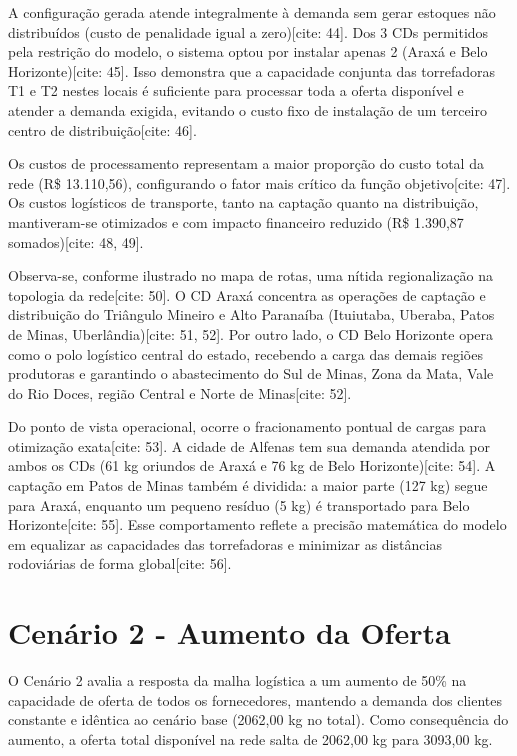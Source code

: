 \documentclass[a4paper,11pt]{article}
\begin{document}
A configuração gerada atende integralmente à demanda sem gerar estoques não distribuídos (custo de penalidade igual a zero)[cite: 44]. Dos 3 CDs permitidos pela restrição do modelo, o sistema optou por instalar apenas 2 (Araxá e Belo Horizonte)[cite: 45]. Isso demonstra que a capacidade conjunta das torrefadoras T1 e T2 nestes locais é suficiente para processar toda a oferta disponível e atender a demanda exigida, evitando o custo fixo de instalação de um terceiro centro de distribuição[cite: 46].

Os custos de processamento representam a maior proporção do custo total da rede (R\$ 13.110,56), configurando o fator mais crítico da função objetivo[cite: 47]. Os custos logísticos de transporte, tanto na captação quanto na distribuição, mantiveram-se otimizados e com impacto financeiro reduzido (R\$ 1.390,87 somados)[cite: 48, 49].

Observa-se, conforme ilustrado no mapa de rotas, uma nítida regionalização na topologia da rede[cite: 50]. O CD Araxá concentra as operações de captação e distribuição do Triângulo Mineiro e Alto Paranaíba (Ituiutaba, Uberaba, Patos de Minas, Uberlândia)[cite: 51, 52]. Por outro lado, o CD Belo Horizonte opera como o polo logístico central do estado, recebendo a carga das demais regiões produtoras e garantindo o abastecimento do Sul de Minas, Zona da Mata, Vale do Rio Doces, região Central e Norte de Minas[cite: 52].

Do ponto de vista operacional, ocorre o fracionamento pontual de cargas para otimização exata[cite: 53]. A cidade de Alfenas tem sua demanda atendida por ambos os CDs (61 kg oriundos de Araxá e 76 kg de Belo Horizonte)[cite: 54]. A captação em Patos de Minas também é dividida: a maior parte (127 kg) segue para Araxá, enquanto um pequeno resíduo (5 kg) é transportado para Belo Horizonte[cite: 55]. Esse comportamento reflete a precisão matemática do modelo em equalizar as capacidades das torrefadoras e minimizar as distâncias rodoviárias de forma global[cite: 56].

\newpage
\section{Cenário 2 - Aumento da Oferta}

O Cenário 2 avalia a resposta da malha logística a um aumento de 50\% na capacidade de oferta de todos os fornecedores, mantendo a demanda dos clientes constante e idêntica ao cenário base (2062,00 kg no total). Como consequência do aumento, a oferta total disponível na rede salta de 2062,00 kg para 3093,00 kg.
\end{document}
